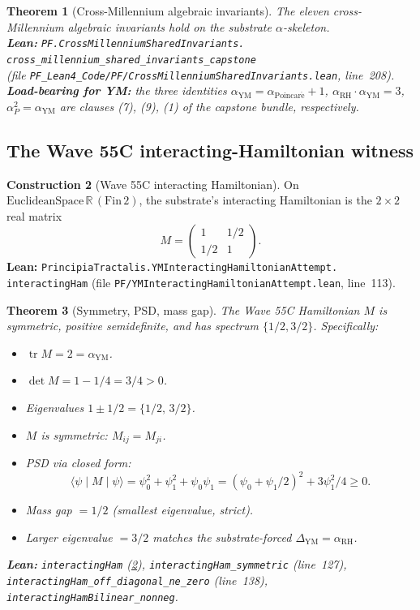 \documentclass[11pt,a4paper]{article}
\theoremstyle{plain}
\newtheorem{theorem}{Theorem}[section]
\theoremstyle{definition}
\newtheorem{construction}[theorem]{Construction}
\DeclareMathOperator{\Tr}{tr}
\newcommand{\R}{\mathbb{R}}
\newcommand{\aYM}{\alpha_{\mathrm{YM}}}
\newcommand{\aRH}{\alpha_{\mathrm{RH}}}
\newcommand{\aP}{\alpha_{P}}
\newcommand{\aPoinc}{\alpha_{\mathrm{Poincar\acute e}}}
\begin{document}
\begin{theorem}[Cross-Millennium algebraic invariants]
\label{thm:cross-mill-lean}
The eleven cross-Millennium algebraic invariants hold on the
substrate $\alpha$-skeleton.\\
\textbf{Lean:}
\texttt{PF.CrossMillenniumSharedInvariants.\\
cross\_millennium\_shared\_invariants\_capstone}\\
(file \texttt{PF\_Lean4\_Code/PF/CrossMillenniumSharedInvariants.lean},
line~208).\\
\textbf{Load-bearing for YM:} the three identities
$\aYM = \aPoinc + 1$, $\aRH \cdot \aYM = 3$, $\aP^{2} = \aYM$ are
clauses (7), (9), (1) of the capstone bundle, respectively.
\end{theorem}

\subsection{The Wave 55C interacting-Hamiltonian witness}

\begin{construction}[Wave 55C interacting Hamiltonian]
\label{cons:wave55C}
On $\mathrm{EuclideanSpace}\,\R\,(\mathrm{Fin}\,2)$, the substrate's
interacting Hamiltonian is the $2 \times 2$ real matrix
\[
M = \begin{pmatrix} 1 & 1/2 \\ 1/2 & 1 \end{pmatrix}.
\]
\textbf{Lean:}
\texttt{PrincipiaTractalis.YMInteractingHamiltonianAttempt.\\
interactingHam} (file
\texttt{PF/YMInteractingHamiltonianAttempt.lean}, line~113).
\end{construction}

\begin{theorem}[Symmetry, PSD, mass gap]
\label{thm:wave55C}
The Wave 55C Hamiltonian $M$ is symmetric, positive semidefinite, and
has spectrum $\{1/2, 3/2\}$. Specifically:
\begin{itemize}[leftmargin=*,nosep]
\item $\Tr M = 2 = \aYM$.
\item $\det M = 1 - 1/4 = 3/4 > 0$.
\item Eigenvalues $1 \pm 1/2 = \{1/2,\, 3/2\}$.
\item $M$ is symmetric: $M_{ij} = M_{ji}$.
\item PSD via closed form:
\[
\langle\psi \mid M \mid \psi\rangle = \psi_{0}^{2} + \psi_{1}^{2} +
\psi_{0}\psi_{1} = (\psi_{0} + \psi_{1}/2)^{2} + 3\psi_{1}^{2}/4
\ge 0.
\]
\item Mass gap $= 1/2$ (smallest eigenvalue, strict).
\item Larger eigenvalue $= 3/2$ matches the substrate-forced
$\Delta_{\mathrm{YM}} = \aRH$.
\end{itemize}
\textbf{Lean:}
\texttt{interactingHam} (\cref{cons:wave55C}),
\texttt{interactingHam\_symmetric} (line~127),
\texttt{interactingHam\_off\_diagonal\_ne\_zero} (line~138),
\texttt{interactingHamBilinear\_nonneg}.
\end{theorem}
\end{document}
